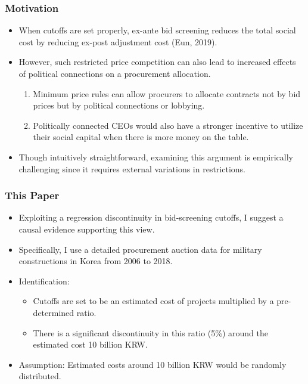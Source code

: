 \documentclass{beamer}
\begin{document}
\begin{frame}
\frametitle{Motivation}
\begin{itemize}
\item When cutoffs are set properly, ex-ante bid screening reduces the total social cost by reducing ex-post adjustment cost (Eun, 2019).
\item However, such restricted price competition can also lead to increased effects of political connections on a procurement allocation.
	\begin{enumerate}
	\item Minimum price rules can allow procurers to allocate contracts not by bid prices but by political connections or lobbying.
	\item Politically connected CEOs would also have a stronger incentive to utilize their social capital when there is more money on the table.
	\end{enumerate}
\item Though intuitively straightforward, examining this argument is empirically challenging since it requires external variations in restrictions.
\end{itemize}
\end{frame}

\begin{frame}
\frametitle{This Paper}
\begin{itemize}
\item Exploiting a regression discontinuity in bid-screening cutoffs, I suggest a causal evidence supporting this view.
\item Specifically, I use a detailed procurement auction data for military constructions in Korea from 2006 to 2018.
\item Identification:
	\begin{itemize}
	\item Cutoffs are set to be an estimated cost of projects multiplied by a pre-determined ratio.
	\item There is a significant discontinuity in this ratio (5\%) around the estimated cost 10 billion KRW.
	\end{itemize}
\item Assumption: Estimated costs around 10 billion KRW would be randomly distributed.
\end{itemize}
\end{frame}
\end{document}
